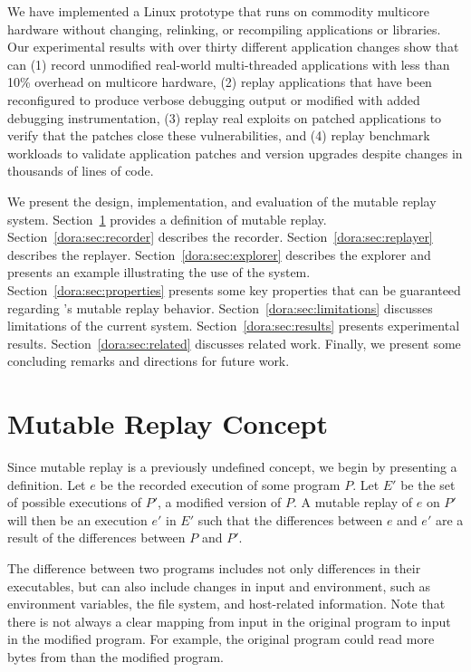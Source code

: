 We have implemented a {\dora} Linux prototype that runs on
commodity multicore hardware without changing, relinking, or
recompiling applications or libraries.  Our experimental results with
over thirty different application changes show that {\dora} can (1)
record unmodified real-world multi-threaded applications with less
than 10\% overhead on multicore hardware, (2) replay applications that
have been reconfigured to produce verbose debugging output or modified
with added debugging instrumentation, (3) replay real exploits on
patched applications to verify that the patches close these
vulnerabilities, and (4) replay benchmark workloads to validate
application patches and version upgrades despite changes in thousands of lines
of code.

	We present the design, implementation, and evaluation of the
	{\dora} mutable replay system.
	Section~\ref{dora:sec:definition} provides a definition of mutable replay.
	Section~\ref{dora:sec:recorder} describes the {\dora} recorder.
	Section~\ref{dora:sec:replayer} describes the {\dora} replayer.
	Section~\ref{dora:sec:explorer} describes the {\dora} explorer and presents an
	example illustrating the use of the system.
	Section~\ref{dora:sec:properties} presents some key properties that
        can be guaranteed regarding
	{\dora}'s mutable replay behavior.
	Section~\ref{dora:sec:limitations} discusses limitations of the current system.
	Section~\ref{dora:sec:results} presents experimental results.
	Section~\ref{dora:sec:related} discusses related work.
	Finally, we present some concluding remarks and directions for future work.

\section{Mutable Replay Concept}
\label{dora:sec:definition}

Since mutable replay is a previously undefined concept, we begin by
presenting a definition.  Let $e$ be the recorded execution of some
program $P$. Let $E'$ be the set of possible executions of $P'$, a
modified version of $P$. A mutable replay of $e$ on $P'$ will then be
an execution $e'$ in $E'$ such that the differences between $e$ and
$e'$ are a result of the differences between $P$ and $P'$.

The difference between two programs includes not only differences in
their executables, but can also include changes in input and
environment, such as environment variables, the file system,
and host-related information.
Note that there is
not always a clear mapping from input in the original program to input
in the modified program. For example, the original program could read more bytes
from  than the modified program.

